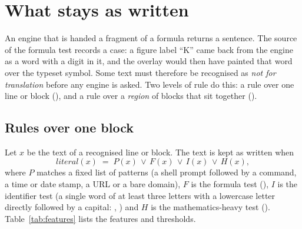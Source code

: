 \section{What stays as written}\label{sec:keep}

An engine that is handed a fragment of a formula returns a sentence. The source of the formula test records a case: a figure label
``K'' came back from the engine as a word with a digit in it, and the overlay would then have painted that word over the typeset symbol. Some
text must therefore be recognised as \emph{not for translation} before any engine is asked. Two levels of rule do this: a rule
over one line or block (), and a rule over a \emph{region} of blocks that sit together
().

\subsection{Rules over one block}

Let $x$ be the text of a recognised line or block. The text is kept as written when
\begin{equation}\label{eq:literal}
\textit{literal}(x)\;=\;P(x)\,\lor\,F(x)\,\lor\,I(x)\,\lor\,H(x),
\end{equation}
where $P$ matches a fixed list of patterns (a shell prompt followed by a command, a time or date stamp, a URL or a bare
domain), $F$ is the formula test (), $I$ is the identifier test (a single word of at least three letters with a
lowercase letter directly followed by a capital: , ) and $H$ is the mathematics-heavy test
(). Table~\ref{tab:features} lists the features and thresholds.

